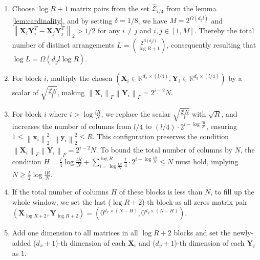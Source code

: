 \begin{enumerate}[leftmargin=16pt]
    \item Choose $\log{R}+1$ matrix pairs from the set $\hat{\mathcal{Z}}_{l/4}$ from the lemma \ref{lem:cardinality}, and by setting $\delta = 1/8$, we have $M = 2^{\Omega(d_yl)}$ and $\left\|\boldsymbol{X}_i\boldsymbol{Y}_i^T-\boldsymbol{X}_j\boldsymbol{Y}_j^T\right\|_2 > 1/2$ for any $i\neq j$ and $i,j\in[1,M]$. Thereby the total number of distinct arrangements $L = \binom{2^{\Omega(d_yl)}}{\log{R}+1}$, consequently resulting that $\log{L} = \Omega(d_yl\log{R})$.

    \item For block $i$, multiply the chosen $(\boldsymbol{X}_i\in \mathbb{R}^{d_x\times (l/4)},\boldsymbol{Y}_i\in \mathbb{R}^{d_y\times (l/4)})$ by a scalar of $\sqrt{\frac{2^iN}{l}}$, making $\left\|\boldsymbol{X}_i\right\|_F\left\|\boldsymbol{Y}_i\right\|_F = 2^{i-2}N$.

    \item For block $i$ where $i>\log{\frac{lR}{N}}$, we replace the scalar $\sqrt{\frac{2^iN}{l}}$ with $\sqrt{R}$, and increases the number of columns from $l/4$ to $(l/4)\cdot 2^{i - \log{\frac{lR}{N}}}$, ensuring $1\leq\left\|\boldsymbol{x}_i\right\|_2^2, \left\|\boldsymbol{y}_i\right\|_2^2\leq R$. This configuration preserves the condition $\left\|\boldsymbol{X}_i\right\|_F\left\|\boldsymbol{Y}_i\right\|_F = 2^{i-2}N$. To bound the total number of columns by $N$, the condition $H = \frac{l}{4}\log{\frac{lR}{N}} +  \sum_{i = \log{\frac{lR}{N}}}^{\log{R}} \frac{l}{4}\cdot 2^{i - \log{\frac{lR}{N}}} \leq N$ must hold, implying $N \geq \frac{l}{2}\log{\frac{lR}{N}}$. 

    \item If the total number of columns $H$ of these blocks is less than $N$, to fill up the whole window, we set the last ($\log{R}+2$)-th block as all zeros matrix pair $(\boldsymbol{X}_{\log{R}+2},\boldsymbol{Y}_{\log{R}+2})=(0^{d_x\times(N-H)},0^{d_y\times(N-H)})$.

    \item Add one dimension to all matrices in all $\log{R}+2$ blocks and set the newly-added ($d_x+1$)-th dimension of each $\boldsymbol{X}_i$ and ($d_y+1$)-th dimension of each $\boldsymbol{Y}_i$ as $1$.
    
\end{enumerate}

